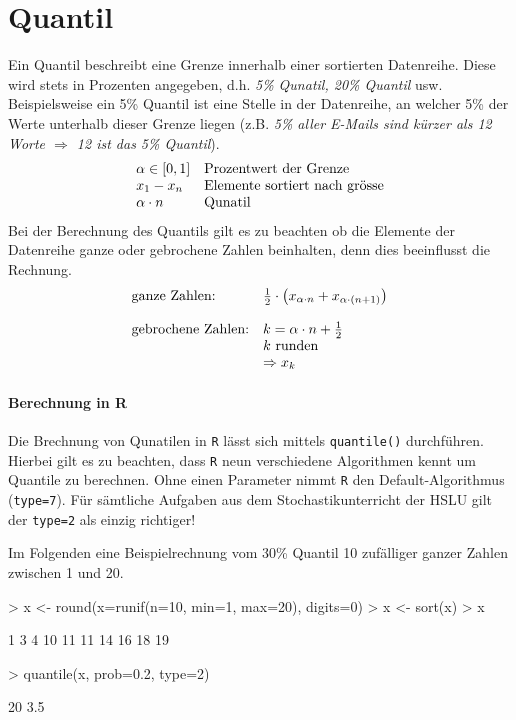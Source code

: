 \section{Quantil}
Ein \gls{Quantil} beschreibt eine Grenze innerhalb einer sortierten 
Datenreihe. Diese wird stets in Prozenten angegeben, d.h. 
\emph{5\% Qunatil, 20\% Quantil} usw. 
Beispielsweise ein 5\% Quantil ist eine Stelle in der Datenreihe, an 
welcher 5\% der Werte unterhalb dieser Grenze liegen (z.B. \emph{5\% 
aller E-Mails sind kürzer als 12 Worte $\Rightarrow$ 12 ist das 5\%
Quantil}).
\[ \begin{array}{l l}
	\alpha \in [0, 1] 
		& \text{Prozentwert der Grenze} \\
	x_1 - x_n
		& \text{Elemente sortiert nach grösse} \\
	\alpha \cdot n 
		& \text{Qunatil} \\
\end{array} \]
Bei der Berechnung des Quantils gilt es zu beachten ob die Elemente 
der Datenreihe ganze oder gebrochene Zahlen beinhalten, denn dies 
beeinflusst die Rechnung.
\[ \begin{array}{l l}
	\text{ganze Zahlen:}
		& \frac{1}{2} \cdot \left(
			x_{\alpha \cdot n} 
			+ x_{\alpha \cdot (n + 1)} \right)  \\
	& \\
	\text{gebrochene Zahlen:}
		& k = \alpha \cdot n + \frac{1}{2}  \\
		& k \text{ runden} \\
		& \Rightarrow x_{k}
\end{array} \]

\paragraph{Berechnung in R}
Die Brechnung von Qunatilen in \lstinline{R} lässt sich mittels 
\lstinline{quantile()} durchführen. Hierbei gilt es zu beachten, dass
\lstinline{R} neun verschiedene Algorithmen kennt um Quantile zu 
berechnen. Ohne einen Parameter nimmt \lstinline{R} den 
Default-Algorithmus (\lstinline{type=7}). Für sämtliche Aufgaben aus dem
Stochastikunterricht der HSLU gilt der \lstinline{type=2} als einzig
richtiger! 

Im Folgenden eine Beispielrechnung vom 30\% \gls{Quantil} 10 zufälliger 
ganzer Zahlen zwischen 1 und 20.
\begin{Schunk}
\begin{Sinput}
> x <- round(x=runif(n=10, min=1, max=20), digits=0)
> x <- sort(x)
> x
\end{Sinput}
\begin{Soutput}
 [1]  1  3  4 10 11 11 14 16 18 19
\end{Soutput}
\begin{Sinput}
> quantile(x, prob=0.2, type=2)
\end{Sinput}
\begin{Soutput}
20%
3.5 
\end{Soutput}
\end{Schunk}

